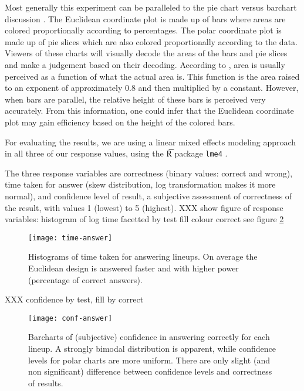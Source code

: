 Most generally this experiment can be paralleled to the pie chart versus barchart discussion \cite{***}. 
The Euclidean coordinate plot is made up of bars where areas are colored proportionally according to percentages. The polar coordinate plot is made up of pie slices which are also colored proportionally according to the data. 
Viewers of these charts will visually decode the areas of the bars and pie slices and make a judgement based on their decoding. According to  \citet[page=40]{kosslyn:2006}, area is usually perceived as a function of what the actual area is. This function is the area raised to an exponent of approximately 0.8 and then multiplied by a constant. However, when bars are parallel, the relative height of these bars is perceived very accurately. From this information, one could infer that the Euclidean coordinate plot may gain efficiency based on the height of the colored bars. 


For evaluating the results, we are using a linear mixed effects modeling \cite{pinheiro:2000} approach in all three of our response values, using the {\t R} package {\tt lme4} \cite{bates:2011}. 

The three response variables are correctness (binary values: correct and wrong),  time taken for answer (skew distribution, log transformation makes it more normal), and confidence level of result, a subjective assessment of correctness of the result, with values 1 (lowest) to 5 (highest).
XXX show figure of response variables: histogram of log time facetted by test fill colour correct see figure \ref{fig:time}
\begin{figure}[htbp] %
   \centering
   \texttt{[image: time-answer]} 
   \caption{Histograms of time taken for answering lineups. On average the Euclidean design is answered faster and with higher power (percentage of correct answers). }
   \label{fig:time}
\end{figure}

XXX confidence by test, fill by correct
\begin{figure}[htbp] %
   \centering
   \texttt{[image: conf-answer]} 
   \caption{Barcharts of (subjective) confidence in answering correctly for each lineup. A strongly bimodal distribution is apparent, while confidence levels for polar charts are more uniform. There are only slight (and non significant) difference between confidence levels and correctness of results.}
   \label{fig:time}
\end{figure}


